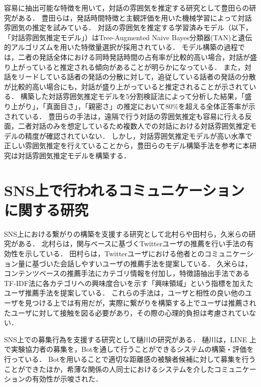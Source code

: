容易に抽出可能な特徴を用いて，対話の雰囲気を推定する研究として豊田ら\cite{Toyota}の研究がある．
豊田らは，発話時間特徴と主観評価を用いた機械学習によって対話雰囲気の推定を試みている．
対話の雰囲気を推定する学習済みモデル（以下，「対話雰囲気推定モデル」）はTree-Augmented Naive Bayes分類器(TAN)と遺伝的アルゴリズムを用いた特徴量選択が採用されている．
モデル構築の過程では，二者の発話全体における同時発話時間の占有率が比較的高い場合，対話が盛り上がっていると推定される傾向があることが明らかになっている．
また，対話をリードしている話者の発話の分散に対して，追従している話者の発話の分散が比較的高い場合にも，対話が盛り上がっていると推定されることが示されている．
構築した対話雰囲気推定モデルを5分割検証法によって分析した結果，「盛り上がり」，「真面目さ」，「親密さ」の推定において80\%を超える全体正答率が示されている．
豊田らの手法は，遠隔で行う対話の雰囲気推定も容易に行える反面，二者対話のみを想定しているため複数人での対話における対話雰囲気推定モデルの精度が確認されていない．
しかし，対話雰囲気推定モデルが高い水準で正しい雰囲気推定を行えていることから，豊田らのモデル構築手法を参考に本研究は対話雰囲気推定モデルを構築する．

\section{SNS上で行われるコミュニケーションに関する研究}

SNS上における繋がりの構築を支援する研究として北村ら\cite{Kitamura}や田村ら\cite{Tamura}，久米ら\cite{Kume}の研究がある．
北村らは，関与ベースに基づくTwitterユーザの推薦を行い手法の有効性を示している．
田村らは，Twitterユーザにおける他者とのコミュニケーション量に基づいた会話しやすいユーザの推薦手法を提案している．
久米らは，コンテンツベースの推薦手法にカテゴリ情報を付加し，特徴語抽出手法であるTF-IDF法に各カテゴリへの興味度合いを示す「興味領域」という指標を加えたユーザ推薦手法を提案している．
これらの手法は，ユーザと相性の良い他のユーザを見つける上では有用だが，実際に繋がりを構築する上でユーザは推薦されたユーザに対して接触を図る必要があり，その際の心理的負担は考慮されていない．

SNS上での募集行為を支援する研究として樋川\cite{Hikawa}の研究がある．
樋川は，LINE \cite{LINE}上で実験協力者の募集を，Botを通して行うことができるシステムの構築・評価を行っている．
Botを用いることで適切な距離感の被験者候補に対して募集を行うことができたほか，希薄な関係の人同士におけるシステムを介したコミュニケーションの有効性が示唆された．
